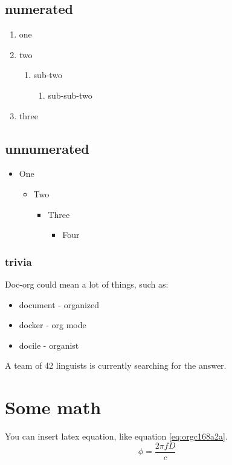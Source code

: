 \subsection{numerated}
\label{sec:org94ba703}
\begin{enumerate}
\item one
\item two
\begin{enumerate}
\item sub-two
\begin{enumerate}
\item sub-sub-two
\end{enumerate}
\end{enumerate}
\item three
\end{enumerate}

\subsection{unnumerated}
\label{sec:orgdded984}
\begin{itemize}
\item One
\begin{itemize}
\item Two
\begin{itemize}
\item Three
\begin{itemize}
\item Four
\end{itemize}
\end{itemize}
\end{itemize}
\end{itemize}

\subsubsection{trivia}
\label{sec:org473548b}
Doc-org could mean a lot of things, such as:
\begin{itemize}
\item document - organized
\item docker - org mode
\item docile - organist
\end{itemize}
A team of 42 linguists is currently searching for the answer.

\section{Some math}
\label{sec:orga55dd29}
You can insert latex equation, like equation \ref{eq:orgc168a2a}.
\begin{equation}
\label{eq:orgc168a2a}
\phi = \frac{2\pi fD}{c}
\end{equation}

